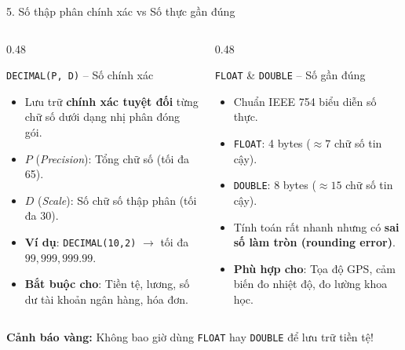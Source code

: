 \documentclass[aspectratio=169,11pt]{beamer}
\newcommand{\kw}[1]{\textcolor{dbblue}{\textbf{#1}}}
\begin{document}
\begin{frame}{5. Số thập phân chính xác vs Số thực gần đúng}
\begin{columns}[t]
  \begin{column}{0.48\textwidth}
    \begin{block}{\texttt{DECIMAL(P, D)} -- Số chính xác}
      \begin{itemize}\setlength{\itemsep}{1.5pt}
        \item Lưu trữ \kw{chính xác tuyệt đối} từng chữ số dưới dạng nhị phân đóng gói.
        \item $P$ (\textit{Precision}): Tổng chữ số (tối đa 65).
        \item $D$ (\textit{Scale}): Số chữ số thập phân (tối đa 30).
        \item \textbf{Ví dụ}: \texttt{DECIMAL(10,2)} $\rightarrow$ tối đa $99{,}999{,}999.99$.
        \item \kw{Bắt buộc cho}: Tiền tệ, lương, số dư tài khoản ngân hàng, hóa đơn.
      \end{itemize}
    \end{block}
  \end{column}
  \begin{column}{0.48\textwidth}
    \begin{block}{\texttt{FLOAT} \& \texttt{DOUBLE} -- Số gần đúng}
      \begin{itemize}\setlength{\itemsep}{1.5pt}
        \item Chuẩn IEEE 754 biểu diễn số thực.
        \item \texttt{FLOAT}: 4 bytes ($\approx 7$ chữ số tin cậy).
        \item \texttt{DOUBLE}: 8 bytes ($\approx 15$ chữ số tin cậy).
        \item Tính toán rất nhanh nhưng có \kw{sai số làm tròn (rounding error)}.
        \item \kw{Phù hợp cho}: Tọa độ GPS, cảm biến đo nhiệt độ, đo lường khoa học.
      \end{itemize}
    \end{block}
  \end{column}
\end{columns}

\begin{center}
  \footnotesize \textcolor{dborange}{\textbf{Cảnh báo vàng:}} Không bao giờ dùng \texttt{FLOAT} hay \texttt{DOUBLE} để lưu trữ tiền tệ!
\end{center}
\end{frame}
\end{document}
